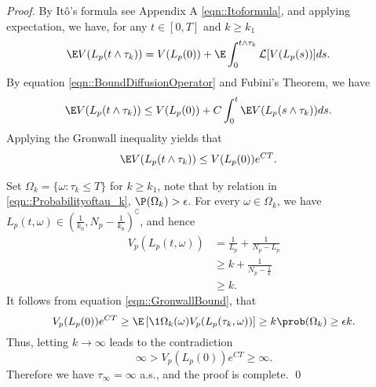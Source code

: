 \begin{proof}
	By It\^{o}'s formula see Appendix A \autoref{eqn::Itoformula}, and applying
	expectation, we have, for any 
	$t \in [0,T]$ and $k\geq k_1$
	\begin{align*}
		\E V(L_p(t\wedge\tau_k)) &= 
			V(L_p(0)) + 
			\E 
				\int_{0}^{t\wedge\tau_k} \mathcal{L}[V(L_p(s))]
			ds.
	\end{align*}
	By equation \autoref{eqn::BoundDiffusionOperator} and Fubini's Theorem, we have
	\begin{align*}
		\E V(L_p(t\wedge\tau_k)) 
			&\leq 
				V(L_p(0)) + 
				C
				\int_{0}^{t}
					\E V(L_p(s\wedge\tau_k))
				ds.
	\end{align*}
	Applying the Gronwall inequality yields that	
	\begin{align}\label{eqn::GronwallBound}
		\E V(L_p(t\wedge\tau_k))&\leq V(L_p(0))e^{CT}.
	\end{align}

		Set 
	$
		\Omega_k = \{\omega : \tau_k\leq T\}
	$ for $k\geq k_1$, note that by relation in 
	\autoref{eqn::Probabilityoftau_k}, 
	$
		\P(\Omega_k) >  \epsilon
	$. For every 
	$
		\omega \in \Omega_k
	$, we have 
	$
		L_p(t,\omega) \in 
		\left(
			\frac{1}{k_0}, N_p - 
			\frac{1}{k_0}
		\right) ^ {\complement}
	$, and hence
	\begin{align*}
		V_p(L_p(t,\omega))
			&=
				\frac{1}{L_p} + 
				\frac{1}{N_p-L_p}
			\\
			&\geq 
				k + 
				\frac{1}{
					N_p - \frac{1}{k}}
			\\
			& \geq k.
	\end{align*}
%	
	It follows from equation \autoref{eqn::GronwallBound}, that
	\begin{equation*}
		V_p(L_p(0)) e^{CT}
			\geq 
			\E 
			\left[
				\1{\Omega_k} (\omega)
				V_p(L_p(\tau_k,\omega))
			\right]
			\geq k
			\prob (\Omega_k)\geq \epsilon k.
	\end{equation*}
%
	Thus, letting $k\rightarrow \infty$ leads to the contradiction
	\begin{equation*}
		\infty>V_p(L_p(0))e^{CT}\geq \infty.	
	\end{equation*}
%
	Therefore we  have $\tau_\infty=\infty$ a.s., and the proof is 
	complete. \qed
\end{proof}
